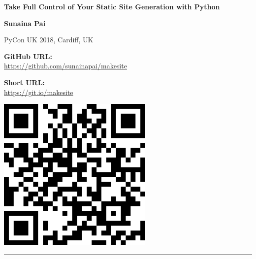 \documentclass[a0]{a0poster}
\newcommand{\rulethickness}{0.7mm}
\newcommand{\rulecolor}{\color{darkgray}}
\begin{document}
\begin{minipage}[b]{0.60\linewidth}
    \veryHuge
    \color{Navy}
    \textbf{%
        Take Full Control of Your Static Site Generation with Python
    }

    \medskip

    \Huge
    \color{black}
    \textbf{Sunaina Pai}

    \medskip

    \huge
    PyCon UK 2018, Cardiff, UK
\end{minipage}
%
\hfill
%
\begin{minipage}[b]{0.19\linewidth}
    \Large
    \color{DarkSlateGray}
    \textbf{GitHub URL:} \\
    \url{https://github.com/sunainapai/makesite}

    \vspace{19mm}

    \textbf{Short URL:} \\
    \url{https://git.io/makesite}
\end{minipage}
\begin{minipage}[b]{76mm}
    \href{https://github.com/sunainapai/makesite}{%
        \includegraphics[width=76mm]{makesite-qr.png}%
    }
\end{minipage}


\rulecolor
\rule{\textwidth}{\rulethickness}
\end{document}
